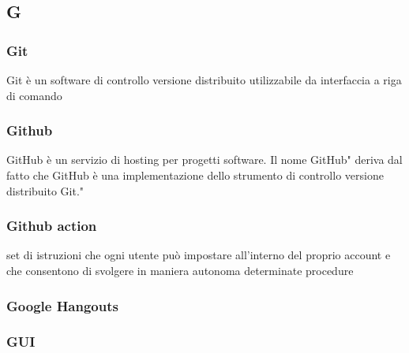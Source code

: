 \subsection*{\textbf{\hfill \Huge{G} \hfill}} 
\subsubsection*{Git}
Git è un software di controllo versione distribuito utilizzabile da interfaccia a riga di comando
\subsubsection*{Github}
GitHub è un servizio di hosting per progetti software. Il nome GitHub" deriva dal fatto che GitHub è una implementazione dello strumento di controllo versione distribuito Git."
\subsubsection*{Github action}
set di istruzioni che ogni utente può impostare all'interno del proprio account e che consentono di svolgere in maniera autonoma determinate procedure
\subsubsection*{Google Hangouts}

\subsubsection*{GUI}

